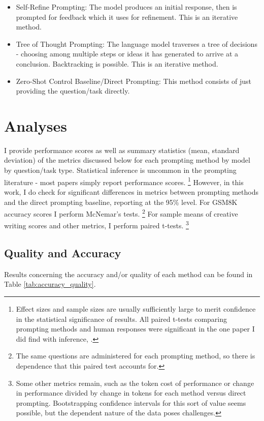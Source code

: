 \documentclass[11pt]{article}
\begin{document}
\begin{itemize}
  \item Self-Refine Prompting: The model produces an initial response, then is prompted for feedback which it uses for refinement. \cite{madaan_Self-Refine_2023} This is an iterative method.
  \item Tree of Thought Prompting: The language model traverses a tree of decisions - choosing among multiple steps or ideas it has generated to arrive at a conclusion. Backtracking is possible. \cite{yao_tree_2023} This is an iterative method.
  \item Zero-Shot Control Baseline/Direct Prompting: This method consists of just providing the question/task directly.
\end{itemize}

\section*{Analyses}

I provide performance scores as well as summary statistics (mean, standard deviation) of the metrics discussed below for each prompting method by model by question/task type. Statistical inference is uncommon in the prompting literature - most papers simply report performance scores. \footnote{Effect sizes and sample sizes are usually sufficiently large to merit confidence in the statistical significance of results. All paired t-tests comparing prompting methods and human responses were significant in the one paper I did find with inference, \citealp{pu_chatgpt_2023}.} However, in this work, I do check for significant differences in metrics between prompting methods and the direct prompting baseline, reporting at the 95\% level. For GSM8K accuracy scores I perform McNemar's tests. \footnote{The same questions are administered for each prompting method, so there is dependence that this paired test accounts for.} For sample means of creative writing scores and other metrics, I perform paired t-tests. \footnote{Some other metrics remain, such as the token cost of performance or change in performance divided by change in tokens for each method versus direct prompting. Bootstrapping confidence intervals for this sort of value seems possible, but the dependent nature of the data poses challenges.}

\subsection*{Quality and Accuracy}

Results concerning the accuracy and/or quality of each method can be found in Table \ref{tab:accuracy_quality}.
\end{document}
